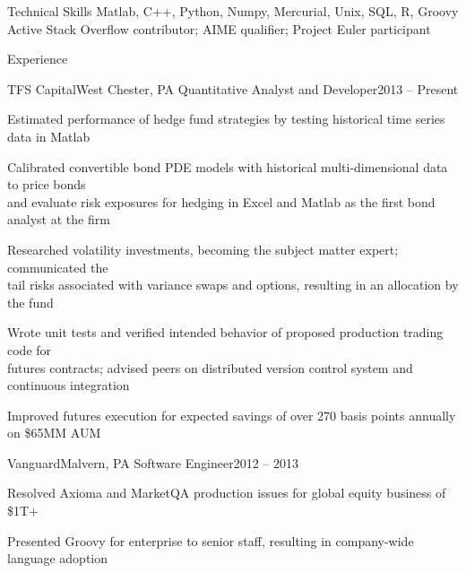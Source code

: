 \documentclass{resume}
\begin{document}

\begin{rSection}{Technical Skills}
Matlab, C++, Python, Numpy, Mercurial, Unix, SQL, R, Groovy \\
Active Stack Overflow contributor; AIME qualifier; Project Euler participant
\end{rSection}


\begin{rSection}{Experience}


\begin{rSubsection}{TFS Capital}{West Chester, PA}
{Quantitative Analyst and Developer}{2013 -- Present}

\item Estimated performance of hedge fund strategies
by testing historical time series data in Matlab
\item Calibrated convertible bond PDE models with historical
multi-dimensional data to price bonds \\ and evaluate
risk exposures for hedging in Excel and Matlab as the
first bond analyst at the firm
\item Researched volatility investments, becoming the subject matter
expert; communicated the \\ tail risks associated with variance swaps
and options, resulting in an allocation by the fund
\item Wrote unit tests and verified intended behavior of proposed
production trading code for \\ futures contracts; advised peers on
distributed version control system and continuous integration
\item Improved futures execution for expected savings of over
270 basis points annually on \$65MM AUM

\end{rSubsection}


\begin{rSubsection}{Vanguard}{Malvern, PA}
{Software Engineer}{2012 -- 2013}
\item Resolved Axioma and MarketQA production issues for global
equity business of \$1T+
\item Presented Groovy for enterprise to senior staff,
resulting in company-wide language adoption
\end{rSubsection}


\end{rSection}
\end{document}
